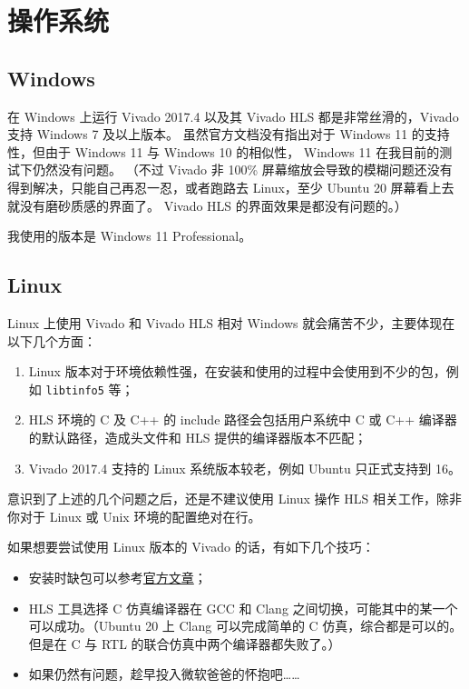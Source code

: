 \documentclass[English,Chinese,French,JP,TC,use boldface,simple name]{beaulivre}
\newenvironment{tip}[1][提示]{%
    \begin{tcolorbox}[breakable,
        enhanced,
        width = \textwidth,
        colback = paper, colbacktitle = paper,
        colframe = gray!50, boxrule=0.2mm,
        coltitle = black,
        fonttitle = \sffamily,
        attach boxed title to top left = {yshift=-\tcboxedtitleheight/2, xshift=.5cm},
        boxed title style = {boxrule=0pt, colframe=paper},
        before skip = 0.3cm,
        after skip = 0.3cm,
        top = 3mm,
        bottom = 3mm,
        title={\scshape\sffamily #1}]%
}{\end{tcolorbox}}
\begin{document}
  \section{操作系统}

    \subsection{Windows}

      在 Windows 上运行 Vivado 2017.4 以及其 Vivado HLS 都是非常丝滑的，Vivado 支持 Windows 7 及以上版本。
      虽然官方文档没有指出对于 Windows 11 的支持性，但由于 Windows 11 与 Windows 10 的相似性，
      Windows 11 在我目前的测试下仍然没有问题。
      （不过 Vivado 非 100\% 屏幕缩放会导致的模糊问题还没有得到解决，只能自己再忍一忍，或者跑路去 Linux，至少 Ubuntu 20 屏幕看上去就没有磨砂质感的界面了。
      Vivado HLS 的界面效果是都没有问题的。）

      \begin{tip}
        我使用的版本是 Windows 11 Professional。
      \end{tip}

    \subsection{Linux}

      Linux 上使用 Vivado 和 Vivado HLS 相对 Windows 就会痛苦不少，主要体现在以下几个方面：
      \begin{enumerate}
        \item Linux 版本对于环境依赖性强，在安装和使用的过程中会使用到不少的包，例如 \texttt{libtinfo5} 等；
        \item HLS 环境的 C 及 C++ 的 include 路径会包括用户系统中 C 或 C++ 编译器的默认路径，造成头文件和 HLS 提供的编译器版本不匹配；
        \item Vivado 2017.4 支持的 Linux 系统版本较老，例如 Ubuntu 只正式支持到 16。
      \end{enumerate}

      \begin{warning}
        意识到了上述的几个问题之后，还是不建议使用 Linux 操作 HLS 相关工作，除非你对于 Linux 或 Unix 环境的配置绝对在行。
      \end{warning}

      如果想要尝试使用 Linux 版本的 Vivado 的话，有如下几个技巧：
      \begin{itemize}
        \item 安装时缺包可以参考\href{https://support.xilinx.com/s/article/63794?language=en_US}{官方文章}；
        \item HLS 工具选择 C 仿真编译器在 GCC 和 Clang 之间切换，可能其中的某一个可以成功。（Ubuntu 20 上 Clang 可以完成简单的 C 仿真，综合都是可以的。但是在 C 与 RTL 的联合仿真中两个编译器都失败了。）
        \item 如果仍然有问题，趁早投入微软爸爸的怀抱吧……
      \end{itemize}
\end{document}
